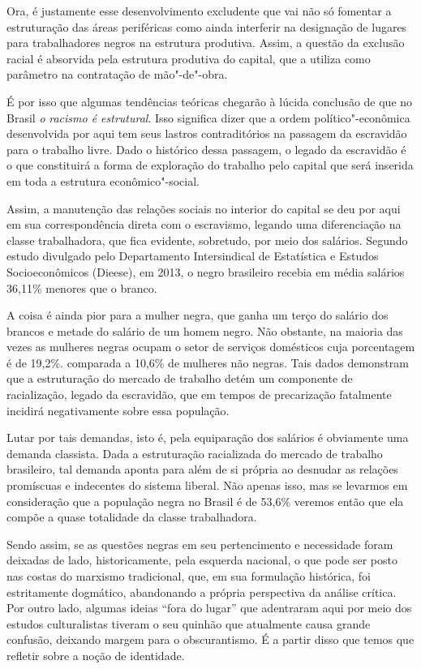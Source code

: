 Ora, é justamente esse desenvolvimento excludente que vai não só
fomentar a estruturação das áreas periféricas como ainda interferir na
designação de lugares para trabalhadores negros na estrutura produtiva.
Assim, a questão da exclusão racial é absorvida pela estrutura produtiva
do capital, que a utiliza como parâmetro na contratação de mão"-de"-obra.

É por isso que algumas tendências teóricas chegarão à lúcida conclusão
de que no Brasil \emph{o} \emph{racismo é estrutural}. Isso significa
dizer que a ordem político"-econômica desenvolvida por aqui tem seus
lastros contraditórios na passagem da escravidão para o trabalho livre.
Dado o histórico dessa passagem, o legado da escravidão é o que
constituirá a forma de exploração do trabalho pelo capital que será
inserida em toda a estrutura econômico"-social.

Assim, a manutenção das relações sociais no interior do capital se deu
por aqui em sua correspondência direta com o escravismo, legando uma
diferenciação na classe trabalhadora, que fica evidente, sobretudo, por
meio dos salários. Segundo estudo divulgado pelo Departamento
Intersindical de Estatística e Estudos Socioeconômicos (Dieese), em
2013, o negro brasileiro recebia em média salários 36,11\% menores que o
branco.

A coisa é ainda pior para a mulher negra, que ganha um terço do salário
dos brancos e metade do salário de um homem negro. Não obstante, na
maioria das vezes as mulheres negras ocupam o setor de serviços
domésticos cuja porcentagem é de 19,2\%. comparada a 10,6\% de mulheres
não negras. Tais dados demonstram que a estruturação do mercado de
trabalho detém um componente de racialização, legado da escravidão, que
em tempos de precarização fatalmente incidirá negativamente sobre essa
população.

Lutar por tais demandas, isto é, pela equiparação dos salários é
obviamente uma demanda classista. Dada a estruturação racializada do
mercado de trabalho brasileiro, tal demanda aponta para além de si
própria ao desnudar as relações promíscuas e indecentes do sistema
liberal. Não apenas isso, mas se levarmos em consideração que a
população negra no Brasil é de 53,6\% veremos então que ela compõe a
quase totalidade da classe trabalhadora.

Sendo assim, se as questões negras em seu pertencimento e necessidade
foram deixadas de lado, historicamente, pela esquerda nacional, o que
pode ser posto nas costas do marxismo tradicional, que, em sua
formulação histórica, foi estritamente dogmático, abandonando a própria
perspectiva da análise crítica. Por outro lado, algumas ideias ``fora do
lugar'' que adentraram aqui por meio dos estudos culturalistas tiveram o
seu quinhão que atualmente causa grande confusão, deixando margem para o
obscurantismo. É a partir disso que temos que refletir sobre a noção de
identidade.

